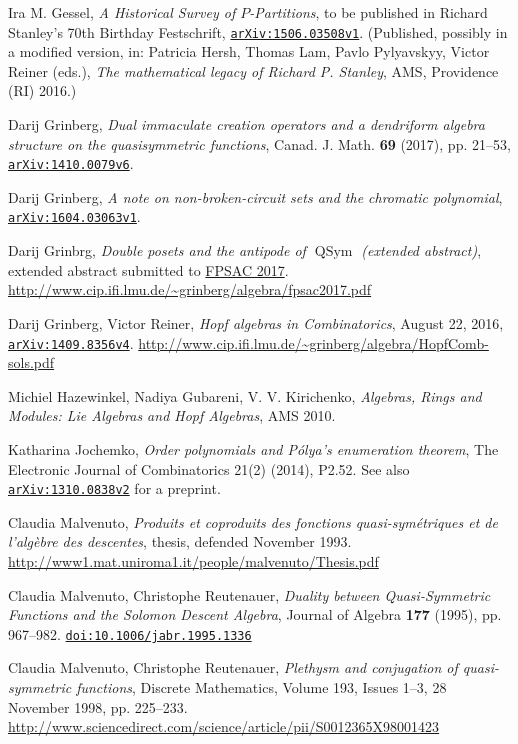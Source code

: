 \documentclass[12pt]{article}
\theoremstyle{plain}
\theoremstyle{definition}
\theoremstyle{remark}
\newcommand{\QSym}{{\operatorname{QSym}}}
\newcommand{\doi}[1]{\href{http://dx.doi.org/#1}{\texttt{doi:#1}}}
\newcommand{\arxiv}[1]{\href{http://arxiv.org/abs/#1}{\texttt{arXiv:#1}}}
\begin{document}
\begin{thebibliography}{10}
Ira M. Gessel, \textit{A Historical Survey of
$P$-Partitions}, to be published in Richard Stanley's 70th Birthday Festschrift,
\arxiv{1506.03508v1}.
\newline (Published, possibly in a modified version, in:
Patricia Hersh, Thomas Lam, Pavlo Pylyavskyy, Victor Reiner (eds.),
\textit{The mathematical legacy of Richard P. Stanley},
AMS, Providence (RI) 2016.)

Darij Grinberg,
\textit{Dual immaculate creation operators and a dendriform algebra
structure on the quasisymmetric functions},
Canad. J. Math. \textbf{69} (2017), pp. 21--53,
\arxiv{1410.0079v6}.

Darij Grinberg,
\textit{A note on non-broken-circuit sets and the chromatic polynomial},
\arxiv{1604.03063v1}.

Darij Grinbrg, \textit{Double posets and the antipode of $\QSym$
(extended abstract)},
extended abstract submitted to \href{https://sites.google.com/site/fpsac2017/}{FPSAC 2017}.
\url{http://www.cip.ifi.lmu.de/~grinberg/algebra/fpsac2017.pdf}

Darij Grinberg, Victor Reiner, \textit{Hopf algebras
in Combinatorics}, August 22, 2016, \arxiv{1409.8356v4}.\newline
\url{http://www.cip.ifi.lmu.de/~grinberg/algebra/HopfComb-sols.pdf}

Michiel Hazewinkel, Nadiya Gubareni, V. V. Kirichenko,
\textit{Algebras, Rings and Modules: Lie Algebras and Hopf Algebras},
AMS 2010.

Katharina Jochemko, \textit{Order polynomials and
P\'{o}lya's enumeration theorem},
The Electronic Journal of Combinatorics 21(2) (2014), P2.52.
See also
\arxiv{1310.0838v2}
for a preprint.

Claudia Malvenuto, \textit{Produits et
coproduits des fonctions quasi-sym\'{e}triques et de l'alg\`{e}bre des
descentes}, thesis, defended November 1993.\newline
\url{http://www1.mat.uniroma1.it/people/malvenuto/Thesis.pdf}

Claudia Malvenuto, Christophe Reutenauer,
\textit{Duality between Quasi-Symmetric Functions and the Solomon
Descent Algebra},
Journal of Algebra \textbf{177} (1995), pp. 967--982.
\newline\doi{10.1006/jabr.1995.1336}

Claudia Malvenuto, Christophe Reutenauer,
\textit{Plethysm and conjugation of quasi-symmetric functions}, Discrete
Mathematics, Volume 193, Issues 1--3, 28 November 1998, pp.
225--233.\newline
\url{http://www.sciencedirect.com/science/article/pii/S0012365X98001423}


\end{thebibliography}
\end{document}
